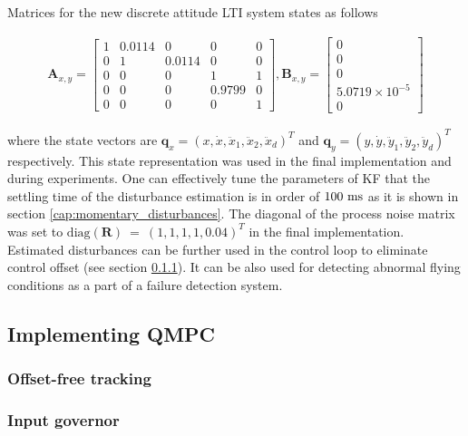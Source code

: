 Matrices for the new discrete attitude LTI system states as follows	

\begin{equation}
\begin{split}
\mathbf{A}_{x, y} = \begin{bmatrix}
1 & 0.0114 & 0 & 0 & 0 \\
0 & 1 & 0.0114 & 0 & 0\\
0 & 0 & 0 & 1 & 1 \\
0 & 0 & 0 & 0.9799 & 0 \\
0 & 0 & 0 & 0 & 1
\end{bmatrix}, \mathbf{B}_{x, y} = \begin{bmatrix}
0\\
0\\
0\\
5.0719 \times 10^{-5}\\
0
\end{bmatrix}
\end{split}
\label{eq:attitude_LTI_big_identified}
\end{equation}

where the state vectors are $\mathbf{q}_{x} = \left(x, \dot{x}, \ddot{x}_1, \ddot{x}_2, \ddot{x}_d\right)^T$ and $\mathbf{q}_{y} = \left(y, \dot{y}, \ddot{y}_1, \ddot{y}_2, \ddot{y}_d\right)^T$ respectively. This state representation was used in the final implementation and during experiments. One can effectively tune the parameters of KF that the settling time of the disturbance estimation is in order of $100~\mathrm{ms}$ as it is shown in section \ref{cap:momentary_disturbances}. The diagonal of the process noise matrix was set to $\mathrm{diag}(\textbf{R})~=~\left(1, 1, 1, 1, 0.04\right)^T$ in the final implementation. Estimated disturbances can be further used in the control loop to eliminate control offset (see section \ref{cap:offset_free_tracking}). It can be also used for detecting abnormal flying conditions as a part of a failure detection system.
 

\subsection{Implementing QMPC}



\subsubsection{Offset-free tracking}
\label{cap:offset_free_tracking}

\subsubsection{Input governor}

